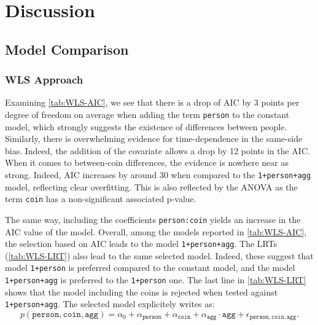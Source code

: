 \documentclass[a4paper, 12pt,oneside]{article}
\begin{document}
	\section{Discussion}
		\subsection{Model Comparison}
		\subsubsection{WLS Approach}
		Examining \ref{tab:WLS-AIC}, we see that there is a drop of AIC by 3 points per degree of freedom on average when adding the term \texttt{person} to the constant model, which strongly suggests the existence of differences between people. Similarly, there is overwhelming evidence for time-dependence in the same-side bias. Indeed, the addition of the  covariate allows a drop by 12 points in the AIC. When it comes to between-coin differences, the evidence is nowhere near as strong. Indeed, AIC increases by around 30 when compared to the \texttt{1+person+agg} model, reflecting clear overfitting. This is also reflected by the ANOVA as the term \texttt{coin} has a non-significant associated p-value.

		The same way, including the coefficients \texttt{person:coin} yields an increase in the AIC value of the model. 
		Overall, among the models reported in \ref{tab:WLS-AIC}, the selection based on AIC leads to the model \texttt{1+person+agg}. 
		The LRTs (\ref{tab:WLS-LRT}) also lead to the same selected model. Indeed, these suggest that model \texttt{1+person} is preferred compared to the constant model, and the model \texttt{1+person+agg} is preferred to the \texttt{1+person} one. The last line in \ref{tab:WLS-LRT} shows that the model including the coins is rejected when tested against \texttt{1+person+agg}. The selected model explicitely writes as:  
		\begin{equation}
			\label{eq:wls_model}
			p(\texttt{person},\texttt{coin},\texttt{agg}) = \alpha_0 + \alpha_{\texttt{person}}+\alpha_{\texttt{coin}} +\alpha_{\texttt{agg}}\cdot\texttt{agg} + \epsilon_{\texttt{person},\texttt{coin},\texttt{agg}}.
		\end{equation}   
\end{document}
